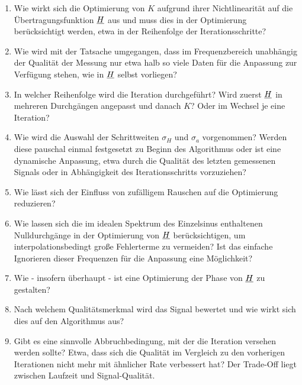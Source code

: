 \documentclass[../Report.tex]{subfiles}
\begin{document}
\begin{enumerate}
	\item 	Wie wirkt sich die Optimierung von $K$ aufgrund ihrer Nichtlinearität auf die Übertragungsfunktion $\underline{H}$ aus und muss dies in der Optimierung berücksichtigt werden, etwa in der Reihenfolge der Iterationsschritte?
	
	\item	Wie wird mit der Tatsache umgegangen, dass im Frequenzbereich unabhängig der Qualität der Messung nur etwa halb so viele Daten für die Anpassung zur Verfügung stehen, wie in $\underline{H}$ selbst vorliegen?
	
	\item	In welcher Reihenfolge wird die Iteration durchgeführt? Wird zuerst $\underline{H}$ in mehreren Durchgängen angepasst und danach $K$? Oder im Wechsel je eine Iteration?
	
	\item 	Wie wird die Auswahl der Schrittweiten $\sigma_H$ und $\sigma_a$ vorgenommen? Werden diese pauschal einmal festgesetzt zu Beginn des Algorithmus oder ist eine dynamische Anpassung, etwa durch die Qualität des letzten gemessenen Signals oder in Abhängigkeit des Iterationsschritts vorzuziehen? 
	
	\item 	\label{enum:opt.noise}Wie lässt sich der Einfluss von zufälligem Rauschen auf die Optimierung reduzieren? 
	
	\item	\label{enum:opt.zeros}Wie lassen sich die im idealen Spektrum des Einzelsinus enthaltenen Nulldurchgänge in der Optimierung von $\underline{H}$ berücksichtigen, um interpolationsbedingt große Fehlerterme zu vermeiden? Ist das einfache Ignorieren dieser Frequenzen für die Anpassung eine Möglichkeit?
	
	\item 	Wie - insofern überhaupt - ist eine Optimierung der Phase von $\underline{H}$ zu gestalten?
	
	\item	Nach welchem Qualitätsmerkmal wird das Signal bewertet und wie wirkt sich dies auf den Algorithmus aus?
	
	\item	Gibt es eine sinnvolle Abbruchbedingung, mit der die Iteration versehen werden sollte? Etwa, dass sich die Qualität im Vergleich zu den vorherigen Iterationen nicht mehr mit ähnlicher Rate verbessert hat? Der Trade-Off liegt zwischen Laufzeit und Signal-Qualität.

\end{enumerate}
\end{document}
